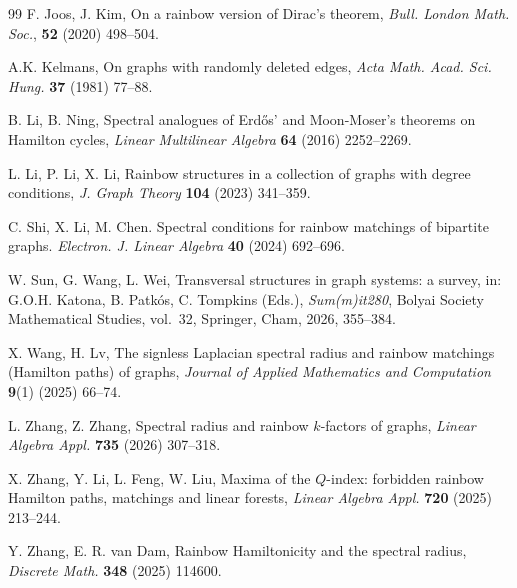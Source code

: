 \documentclass[11pt,a4paper]{article}
\theoremstyle{definition}
\numberwithin{equation}{section}
\begin{document}
\begin{thebibliography}{99}
F. Joos, J. Kim, On a rainbow version of Dirac's theorem, \emph{Bull. London Math. Soc.}, \textbf{52} (2020) 498--504.

A.K. Kelmans, On graphs with randomly deleted edges, \emph{Acta Math. Acad. Sci. Hung.} \textbf{37} (1981) 77--88.

B. Li, B. Ning, Spectral analogues of Erd\H{o}s' and Moon-Moser's theorems on Hamilton cycles, \emph{Linear Multilinear Algebra} \textbf{64} (2016) 2252--2269.

L. Li, P. Li, X. Li, Rainbow structures in a collection of graphs with degree conditions, \emph{J. Graph Theory} \textbf{104} (2023) 341--359.

C. Shi, X. Li, M. Chen. Spectral conditions for rainbow matchings of bipartite graphs. \emph{Electron. J. Linear Algebra} \textbf{40} (2024) 692--696.

W. Sun, G. Wang, L. Wei, Transversal structures in graph systems: a survey, in: G.O.H. Katona, B. Patk\'os, C. Tompkins (Eds.), \emph{Sum(m)it280}, Bolyai Society Mathematical Studies, vol.~32, Springer, Cham, 2026, 355--384.

X. Wang, H. Lv, The signless Laplacian spectral radius and rainbow matchings (Hamilton paths) of graphs, \emph{Journal of Applied Mathematics and Computation} \textbf{9}(1) (2025) 66--74.

L. Zhang, Z. Zhang, Spectral radius and rainbow $k$-factors of graphs, \emph{Linear Algebra Appl.} \textbf{735} (2026) 307--318.

X. Zhang, Y. Li, L. Feng, W. Liu, Maxima of the $Q$-index: forbidden rainbow Hamilton paths, matchings and linear forests, \emph{Linear Algebra Appl.} \textbf{720} (2025) 213--244.

Y. Zhang, E. R. van Dam, Rainbow Hamiltonicity and the spectral radius, \emph{Discrete Math.} \textbf{348} (2025) 114600.

\end{thebibliography}
\end{document}
